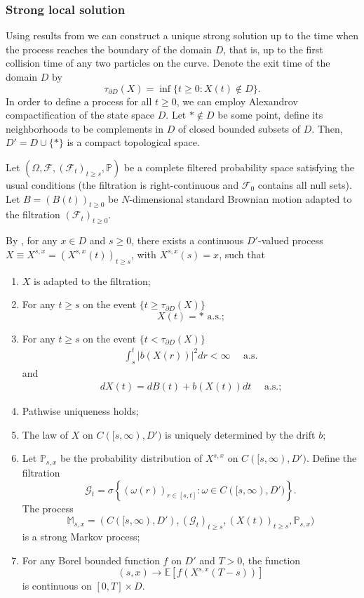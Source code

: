 \documentclass[11pt]{article}
\numberwithin{equation}{section}
\theoremstyle{definition}
\begin{document}
\subsubsection{Strong local solution}
Using results from \cite{krylov2005strong} we can construct a unique strong solution up to the time when the process reaches the boundary of the domain $ D$, that is, up to the first collision time of any two particles on the curve. Denote the exit time of the domain $D$ by 
\[
    \tau_{\partial D}(X)= \inf\{t\ge0:X(t)\notin  D\}.
\]
In order to define a process for all $t\ge0$,  we can employ Alexandrov compactification of the state space $ D$. Let $*\notin D$ be some point, define its neighborhoods to be complements in $ D$ of closed bounded subsets of $ D$. Then, $ D'= D\cup\{*\}$ is a compact topological space. 


Let $(\Omega, \mathcal{F}, (\mathcal{F}_{t})_{t\ge s}, \mathbb{P})$ be a complete filtered probability space satisfying the usual conditions (the filtration is right-continuous and $\mathcal{F}_{0}$ contains all null sets). Let $B = (B(t))_{t\ge 0}$ be $N$-dimensional standard Brownian motion adapted to the filtration $(\mathcal{F}_{t})_{t\ge0}$. 
    
By \cite[Theorems 2.1, 2.5]{krylov2005strong}, for any $x\in D$ and $s\ge0$, there exists a continuous $ D'$-valued process $X\equiv X^{s,x}=(X^{s,x}(t))_{t\ge s}$, with $X^{s,x}(s)=x$, such that 
\begin{enumerate}
        \item $X$ is adapted to the filtration;
        \item For any $t\ge s$ on the event $\{t\ge \tau_{\partial D}(X) \}$ $$X(t)=* \text{ a.s.;}$$
        \item For any $t\ge s$ on the event $\{t<\tau_{\partial D}(X)\}$ 
        \begin{align*}
            \int_{s}^{t}|b(X(r))|^{2}dr<\infty\quad \text{ a.s.}
        \end{align*}
        and
        \begin{align*}
            dX(t) = dB(t)+b(X(t))dt\quad \text{ a.s.;}
        \end{align*}
        \item Pathwise uniqueness holds;
        \item The law of $X$ on $C([s,\infty),  D')$ is uniquely determined by the drift $b$;
        \item Let $\mathbb{P}_{s,x}$ be the probability distribution of $X^{s,x}$ on $C([s,\infty), D')$. Define the filtration  
        \[
            \mathcal{G}_{t} = \sigma\left\{(\omega(r))_{r\in [s,t]}: \omega\in C([s,\infty),  D') \right\}.
        \]
        The process
        \[
            \mathbb{M}_{s,x}= (C([s,\infty),  D'), (\mathcal{G}_{t})_{t\ge s}, (X(t))_{t\ge s}, \mathbb{P}_{s,x})
        \]
        is a strong Markov process;
        \item For any Borel bounded function $f$ on $ D'$ and $T>0$, the function 
        \[
            (s,x)\to\mathbb{E}\left[f(X^{s,x}(T-s))\right]
        \]
        is continuous on $[0,T]\times D$.
\end{enumerate}
\end{document}
